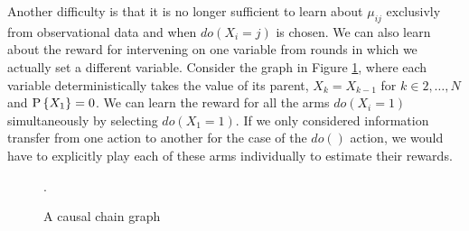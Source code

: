 Another difficulty is that it is no longer sufficient to learn about $\mu_{ij}$ exclusivly from observational data and when $do(X_i = j)$ is chosen.
We can also learn about the reward for intervening on one variable from rounds in which we actually set a different variable.
Consider the graph in Figure \ref{fig:causalchain}, where each variable deterministically takes the value of its parent, $X_k = X_{k-1}$ 
for $k\in {2,\ldots,N}$ and $\P{X_1} = 0$. 
We can learn the reward for all the arms $do(X_i = 1)$ simultaneously by selecting $do(X_1 = 1)$. 
If we only considered information transfer from one action to another for the case of the $do()$ action, we would have to 
explicitly play each of these arms individually to estimate their rewards. 

\begin{figure}[h]
\centering
\caption{A causal chain graph}.
\label{fig:causalchain}
\end{figure} 



